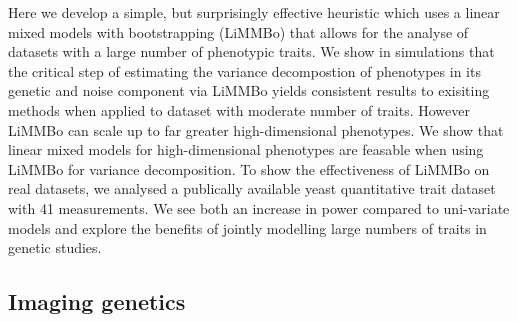 Here we develop a simple, but surprisingly effective heuristic which uses a linear mixed models with bootstrapping (LiMMBo) that allows for the analyse of datasets with a large number of phenotypic traits. We show in simulations that the critical step of estimating the variance decompostion of phenotypes in its genetic and noise component via LiMMBo yields consistent results to exisiting methods when applied to dataset with moderate number of traits. However LiMMBo can scale up to far greater high-dimensional phenotypes. We show that linear mixed models for high-dimensional phenotypes are feasable when using LiMMBo for variance decomposition. To show the effectiveness of LiMMBo on real datasets, we analysed a publically available yeast quantitative trait dataset \citep{Bloom2013} with 41 measurements. We see both an increase in power compared to uni-variate models and explore the benefits of jointly modelling large numbers of traits in genetic studies.

\subsection{Imaging genetics}
